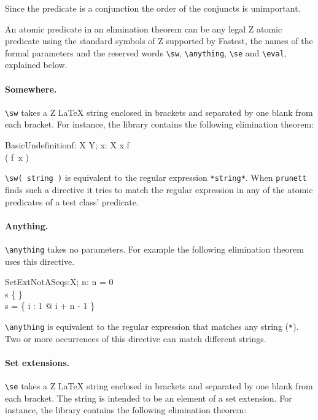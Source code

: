 Since the predicate is a conjunction the order of the conjuncts is unimportant.

An atomic predicate in an elimination theorem can be any legal Z atomic predicate using the standard symbols of Z supported by Fastest, the names of the formal parameters and the reserved words \verb+\sw+, \verb+\anything+, \verb+\se+ and \verb+\eval+, explained below.

\paragraph{Somewhere.} \verb+\sw+ takes a Z \LaTeX{} string enclosed in brackets and separated by one blank from each bracket. For instance, the library contains the following elimination theorem:

\begin{theorem}{BasicUndefinition}{f: X \pfun Y; x: X}
x \notin \dom f \\
\sw( f~x ) \\
\end{theorem}

\verb+\sw( string )+ is equivalent to the regular expression \verb+*string*+. When \verb+prunett+ finds such a directive it tries to match the regular expression in any of the atomic predicates of a test class' predicate.

\paragraph{Anything.} \verb+\anything+ takes no parameters. For example the following elimination theorem uses this directive.

\begin{theorem}{SetExtNotASeq}{s:\seq X; n:\nat}
n = 0 \\
s \neq \{ \} \\
\dom s = \dom \{ i : 1 \upto \anything @ i + n - 1 \mapsto \anything \}
\end{theorem}

\verb+\anything+ is equivalent to the regular expression that matches any string (\verb+*+). Two or more occurrences of this directive can match different strings.

\paragraph{Set extensions.} \verb+\se+ takes a Z \LaTeX{} string enclosed in brackets and separated by one blank from each bracket. The string is intended to be an element of a set extension. For instance, the library contains the following elimination theorem:


